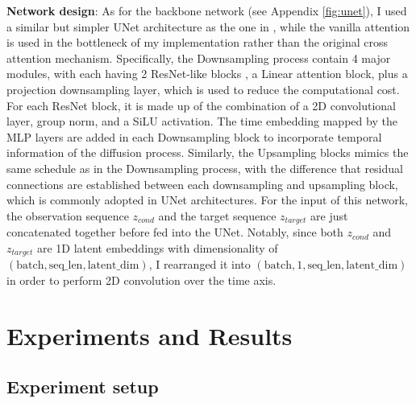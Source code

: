\documentclass[final-report]{article-template}
\begin{document}
\textbf{Network design}: As for the backbone network (see Appendix \ref{fig:unet}), I used a similar but simpler UNet architecture as the one in \cite{rombach2022highresolution}, while the vanilla attention is used in the bottleneck of my implementation rather than the original cross attention mechanism. Specifically, the Downsampling process contain 4 major modules, with each having 2 ResNet-like blocks \cite{he2016deep}, a Linear attention block, plus a projection downsampling layer, which is used to reduce the computational cost. For each ResNet block, it is made up of the combination of a 2D convolutional layer, group norm, and a SiLU activation. The time embedding mapped by the MLP layers are added in each Downsampling block to incorporate temporal information of the diffusion process. Similarly, the Upsampling blocks mimics the same schedule as in the Downsampling process, with the difference that residual connections are established between each downsampling and upsampling block, which is commonly adopted in UNet architectures. For the input of this network, the observation sequence $z_{cond}$ and the target sequence $z_{target}$ are just concatenated together before fed into the UNet. Notably, since both $z_{cond}$ and $z_{target}$ are 1D latent embeddings with dimensionality of $(\text{batch}, \text{seq\_len}, \text{latent\_dim})$, I rearranged it into $(\text{batch}, 1, \text{seq\_len}, \text{latent\_dim})$ in order to perform 2D convolution over the time axis.\\  




\section{Experiments and Results}
\subsection{Experiment setup}
\end{document}
